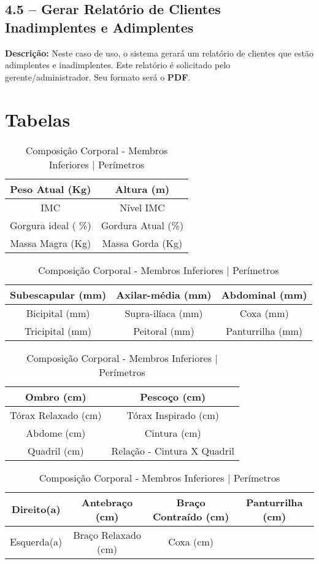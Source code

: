 \documentclass[12pt,a4paper,oneside]{report}
\begin{document}
	\subsection*{4.5 -- Gerar Relatório de Clientes Inadimplentes e Adimplentes} 
	\textbf{Descrição:} Neste caso de uso, o sistema gerará um relatório de clientes que estão adimplentes e inadimplentes. Este relatório é solicitado pelo gerente/administrador. Seu formato será o \textbf{PDF}.
	
	
\section*{Tabelas}
\label{tabelas}
\begin{table}[!h]
\centering
\begin{tabular}{|c|c|}

\hline Peso Atual (Kg) & Altura (m) \\ 
\hline IMC & Nível IMC \\ 
\hline Gorgura ideal ( \%) & Gordura Atual (\%) \\ 
\hline Massa Magra (Kg) & Massa Gorda (Kg) \\ 
\hline 

\end{tabular}
\caption{Composição Corporal - Índices}
\vspace{1cm}

\begin{tabular}{|c|c|c|}
\hline Subescapular (mm) & Axilar-média (mm) & Abdominal (mm) \\ 
\hline Bicipital (mm) & Supra-ilíaca (mm) & Coxa (mm) \\ 
\hline Tricipital (mm) & Peitoral (mm) & Panturrilha (mm) \\ 
\hline 

\end{tabular} 
\caption{Composição Corporal - Dobras Cutâneas - Perímetros}
\vspace{1cm}

\begin{tabular}{|c|c|}
\hline Ombro (cm) & Pescoço (cm) \\ 
\hline Tórax Relaxado (cm) & Tórax Inspirado (cm) \\ 
\hline Abdome (cm) & Cintura (cm) \\ 
\hline Quadril (cm) & Relação - Cintura X Quadril \\ 
\hline 

\end{tabular} 
\caption{Composição Corporal - Membros Superiores | Perímetros}
\vspace{1cm}
\begin{tabular}{|c|c|c|c|}
\hline Direito(a) & Antebraço (cm) & Braço Contraído (cm) & Panturrilha (cm) \\ 
\hline Esquerda(a) & Braço Relaxado (cm) & Coxa (cm) &  \\ 
\hline 

\end{tabular} 
\caption{Composição Corporal - Membros Inferiores | Perímetros}
\end{table}
		
\end{document}
